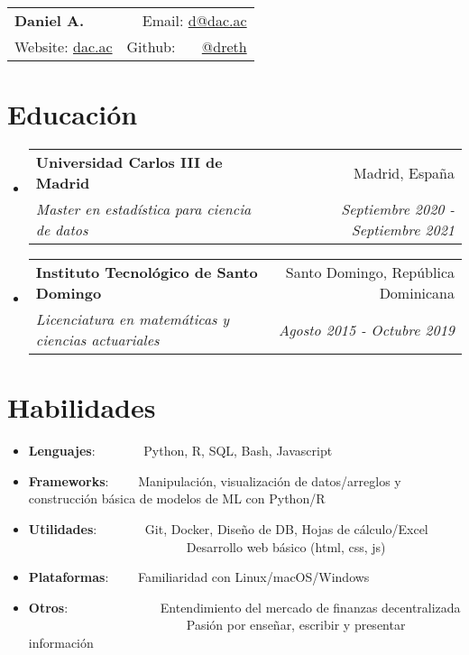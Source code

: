 \documentclass[a4paper,20pt]{article}
\makeatletter
\newcommand{\resumeItem}[2]{
  \item\small{
    \textbf{#1}{: #2 \vspace{-2pt}}
  }
}
\newcommand{\resumeSubheading}[4]{
  \vspace{-1pt}\item
    \begin{tabular*}{0.97\textwidth}{l@{\extracolsep{\fill}}r}
      \textbf{#1} & #2 \\
      \textit{#3} & \textit{#4} \\
    \end{tabular*}\vspace{-5pt}
}
\newcommand{\resumeSubItem}[2]{\resumeItem{#1}{#2}\vspace{-3pt}}
\newcommand{\resumeSubHeadingListStart}{\begin{itemize}[leftmargin=*]}
\newcommand{\resumeSubHeadingListEnd}{\end{itemize}}
\makeatother
\begin{document}
\begin{tabular*}{\textwidth}{l@{\extracolsep{\fill}}r}
  \textbf{{\LARGE Daniel A.}} & Email: {\color{blue}\href{mailto:}{d@dac.ac}}\\
  Website: {\color{blue}\href{https://dac.ac}{dac.ac}} & Github: ~~~{\color{blue}\href{https://github.com/dreth}{@dreth}}
\end{tabular*}




            
\vspace{-4pt}
\section{Educación}
\resumeSubHeadingListStart
        
  \resumeSubheading
    {Universidad Carlos III de Madrid}{Madrid, España}
    {Master en estadística para ciencia de datos}{Septiembre 2020 - Septiembre 2021}
\vspace{-2pt}
  \resumeSubheading
    {Instituto Tecnológico de Santo Domingo}{Santo Domingo, República Dominicana}
    {Licenciatura en matemáticas y ciencias actuariales}{Agosto 2015 - Octubre 2019}
\resumeSubHeadingListEnd


            
\vspace{-7pt}
\section{Habilidades}
  \resumeSubHeadingListStart
            
        
\vspace{-2pt}
\resumeSubItem{Lenguajes}{~~~~~~~Python, R, SQL, Bash, Javascript}
\vspace{-2pt}
\resumeSubItem{Frameworks}{~~~~Manipulación, visualización de datos/arreglos y construcción básica de modelos de ML con Python/R}
\vspace{-2pt}
\resumeSubItem{Utilidades}{~~~~~~~Git, Docker, Diseño de DB, Hojas de cálculo/Excel\\~~~~~~~~~~~~~~~~~~~~~~~~~Desarrollo web básico (html, css, js)}
\vspace{-2pt}
\resumeSubItem{Plataformas}{~~~~Familiaridad con Linux/macOS/Windows}
\vspace{-2pt}
\resumeSubItem{Otros}{~~~~~~~~~~~~~~Entendimiento del mercado de finanzas decentralizada\\~~~~~~~~~~~~~~~~~~~~~~~~~Pasión por enseñar, escribir y presentar información}
\resumeSubHeadingListEnd
\end{document}
